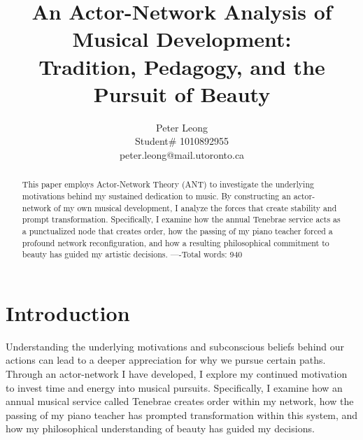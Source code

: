 \documentclass{article} %
\title{An Actor-Network Analysis of Musical Development:\\
Tradition, Pedagogy, and the Pursuit of Beauty}
\author{Peter Leong \\
Student\# 1010892955 \\
peter.leong@mail.utoronto.ca \\
\AND
}
\begin{document}
\vspace{-4ex}

\maketitle

\vspace{-12ex}

\begin{abstract}
This paper employs Actor-Network Theory (ANT) to investigate the underlying motivations behind my sustained dedication to music. 
By constructing an actor-network of my own musical development, I analyze the forces that create stability and prompt transformation. 
Specifically, I examine how the annual Tenebrae service acts as a punctualized node that creates order, how the passing of my piano teacher forced a profound network reconfiguration, and how a resulting philosophical commitment to beauty has guided my artistic decisions. 
----Total words: 940
\end{abstract}

\vspace{-2ex}


\section{Introduction}

Understanding the underlying motivations and subconscious beliefs behind our actions can lead to a deeper appreciation for why we pursue certain paths. 
Through an actor-network I have developed, I explore my continued motivation to invest time and energy into musical pursuits. 
Specifically, I examine how an annual musical service called Tenebrae creates order within my network, how the passing of my piano teacher has prompted transformation within this system, and how my philosophical understanding of beauty has guided my decisions.
\end{document}
